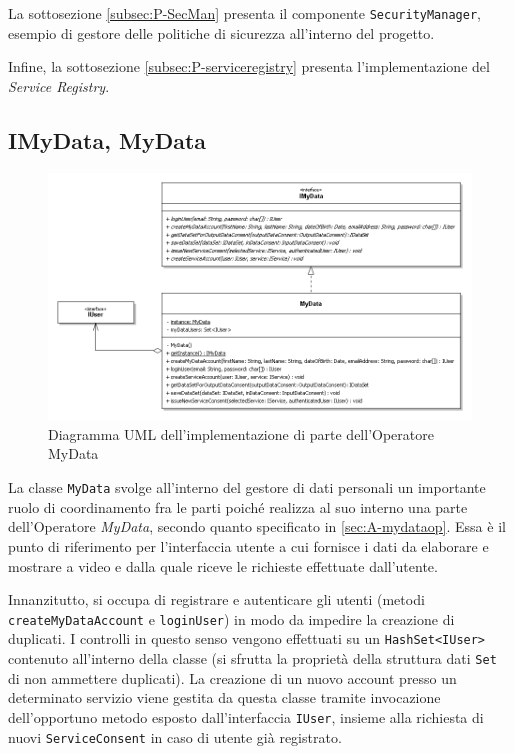 La sottosezione \ref{subsec:P-SecMan} presenta il componente \texttt{SecurityManager}, esempio di gestore delle politiche di sicurezza all'interno del progetto.

Infine, la sottosezione \ref{subsec:P-serviceregistry} presenta l'implementazione del \textit{Service Registry}.

\subsection{IMyData, MyData}
\label{subsec:P-imydataMyData}
\begin{figure} [h]
	\centering
	\includegraphics[width=0.8\linewidth]{pictures/MyData.png}
	\caption{Diagramma UML dell'implementazione di parte dell'Operatore MyData}
	\label{fig:Accounting-MyData}
\end{figure}
La classe \texttt{MyData} svolge all’interno del gestore di dati personali un importante ruolo di coordinamento fra le parti poich\'e realizza al suo interno una parte dell’Operatore \textit{MyData}, secondo quanto specificato in \ref{sec:A-mydataop}. Essa \`e il punto di riferimento per l’interfaccia utente a cui fornisce i dati da elaborare e mostrare a video e dalla quale riceve le richieste effettuate dall’utente.

Innanzitutto, si occupa di registrare e autenticare gli utenti (metodi \texttt{createMyDataAccount} e \texttt{loginUser}) in modo da impedire la creazione di duplicati. I controlli in questo senso vengono effettuati su un \texttt{HashSet<IUser>} contenuto all’interno della classe (si sfrutta la propriet\`a della struttura dati \texttt{Set} di non ammettere duplicati). La creazione di un nuovo account presso un determinato servizio viene gestita da questa classe tramite invocazione dell’opportuno metodo esposto dall’interfaccia \texttt{IUser}, insieme alla richiesta di nuovi \texttt{ServiceConsent} in caso di utente gi\`a registrato.

